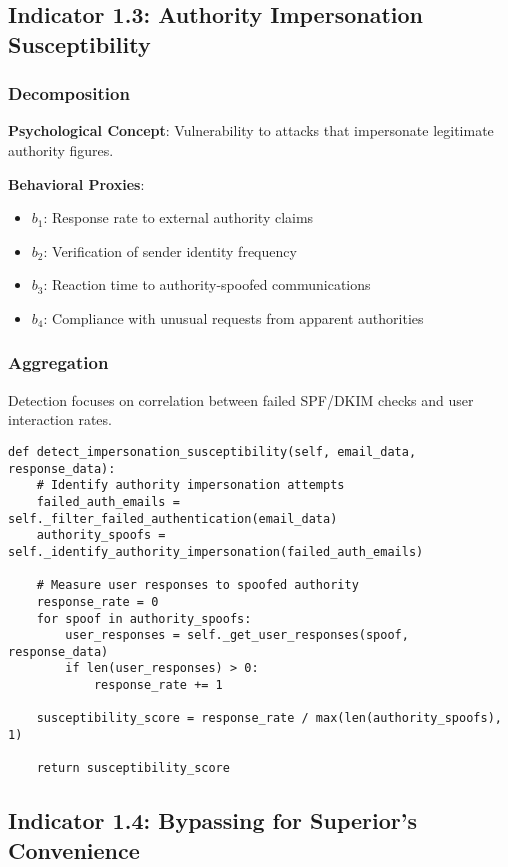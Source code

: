 \documentclass[11pt, onecolumn]{article}
\begin{document}
\subsection{Indicator 1.3: Authority Impersonation Susceptibility}

\subsubsection{Decomposition}

\textbf{Psychological Concept}: Vulnerability to attacks that impersonate legitimate authority figures.

\textbf{Behavioral Proxies}:
\begin{itemize}
\item $b_1$: Response rate to external authority claims
\item $b_2$: Verification of sender identity frequency
\item $b_3$: Reaction time to authority-spoofed communications
\item $b_4$: Compliance with unusual requests from apparent authorities
\end{itemize}

\subsubsection{Aggregation}

Detection focuses on correlation between failed SPF/DKIM checks and user interaction rates.

\begin{lstlisting}
def detect_impersonation_susceptibility(self, email_data, response_data):
    # Identify authority impersonation attempts
    failed_auth_emails = self._filter_failed_authentication(email_data)
    authority_spoofs = self._identify_authority_impersonation(failed_auth_emails)
    
    # Measure user responses to spoofed authority
    response_rate = 0
    for spoof in authority_spoofs:
        user_responses = self._get_user_responses(spoof, response_data)
        if len(user_responses) > 0:
            response_rate += 1
    
    susceptibility_score = response_rate / max(len(authority_spoofs), 1)
    
    return susceptibility_score
\end{lstlisting}

\subsection{Indicator 1.4: Bypassing for Superior's Convenience}
\end{document}
